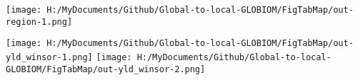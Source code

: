 \documentclass[]{article}
\begin{document}
\texttt{[image: H:/MyDocuments/Github/Global-to-local-GLOBIOM/FigTabMap/out-region-1.png]}

\texttt{[image: H:/MyDocuments/Github/Global-to-local-GLOBIOM/FigTabMap/out-yld\_winsor-1.png]}
\texttt{[image: H:/MyDocuments/Github/Global-to-local-GLOBIOM/FigTabMap/out-yld\_winsor-2.png]}
\end{document}

